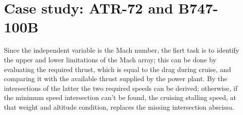 \section{Case study: ATR-72 and B747-100B}


Since the independent variable is the Mach number, the fisrt task is to identify the upper and lower limitations of the Mach array; this can be done by evaluating the required thrust, which is equal to the drag during cruise, and comparing it with the available thrust supplied by the power plant. By the intersections of the latter the two required speeds can be derived; otherwise, if the minimum speed intersection can't be found, the cruising stalling speed, at that weight and altitude condition, replaces the missing intersection abscissa.

